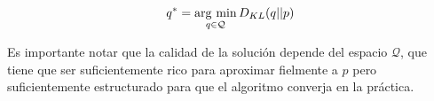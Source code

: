 \documentclass[main.tex]{subfiles}
\begin{document}
\begin{equation}
	q^* = \operatorname*{arg\,\min}_{q \in \mathcal{Q}} D_{KL}(q || p)	
\end{equation}

Es importante notar que la calidad de la solución depende del espacio $\mathcal{Q}$, que tiene que ser suficientemente rico para aproximar fielmente a $p$ pero suficientemente estructurado para que el algoritmo converja en la práctica. 
\end{document}

